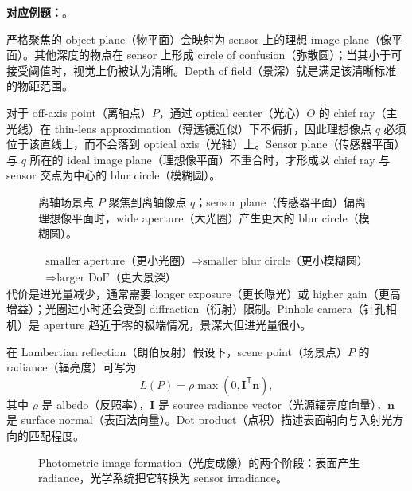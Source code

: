 \textbf{对应例题：}。


严格聚焦的 object plane（物平面）会映射为 sensor 上的理想 image plane（像平面）。其他深度的物点在 sensor 上形成 circle of confusion（弥散圆）；当其小于可接受阈值时，视觉上仍被认为清晰。Depth of field（景深）就是满足该清晰标准的物距范围。

对于 off-axis point（离轴点）$P$，通过 optical center（光心）$O$ 的 chief ray（主光线）在 thin-lens approximation（薄透镜近似）下不偏折，因此理想像点 $q$ 必须位于该直线上，而不会落到 optical axis（光轴）上。Sensor plane（传感器平面）与 $q$ 所在的 ideal image plane（理想像平面）不重合时，才形成以 chief ray 与 sensor 交点为中心的 blur circle（模糊圆）。

\begin{figure}[htbp]
  \centering
  \resizebox{0.88\textwidth}{!}{}
  \caption{离轴场景点 $P$ 聚焦到离轴像点 $q$；sensor plane（传感器平面）偏离理想像平面时，wide aperture（大光圈）产生更大的 blur circle（模糊圆）。}
  \label{fig:sc4061-l01-depth-of-field}
\end{figure}

\[
  \begin{gathered}
    \text{smaller aperture（更小光圈）}
    \Longrightarrow \text{smaller blur circle（更小模糊圆）}\\
    \Longrightarrow \text{larger DoF（更大景深）}
  \end{gathered}
\]
代价是进光量减少，通常需要 longer exposure（更长曝光）或 higher gain（更高增益）；光圈过小时还会受到 diffraction（衍射）限制。Pinhole camera（针孔相机）是 aperture 趋近于零的极端情况，景深大但进光量很小。


在 Lambertian reflection（朗伯反射）假设下，scene point（场景点）$P$ 的 radiance（辐亮度）可写为
\[
  L(P)=\rho\max\!\left(0,\bm I^{\mathsf T}\bm n\right),
\]
其中 $\rho$ 是 albedo（反照率），$\bm I$ 是 source radiance vector（光源辐亮度向量），$\bm n$ 是 surface normal（表面法向量）。Dot product（点积）描述表面朝向与入射光方向的匹配程度。

\begin{figure}[htbp]
  \centering
  \resizebox{\textwidth}{!}{}
  \caption{Photometric image formation（光度成像）的两个阶段：表面产生 radiance，光学系统把它转换为 sensor irradiance。}
  \label{fig:sc4061-l01-photometry}
\end{figure}

